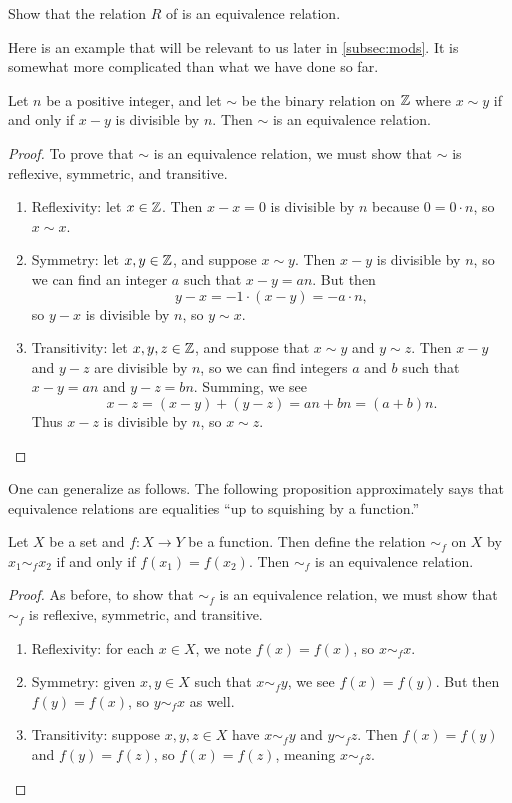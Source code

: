 \documentclass[../notes.tex]{subfiles}
\begin{document}
\begin{exe}
    Show that the relation $R$ of  is an equivalence relation.
\end{exe}
Here is an example that will be relevant to us later in \cref{subsec:mods}. It is somewhat more complicated than what we have done so far.
\begin{prop} \label{prop:mods-equiv-relation}
    Let $n$ be a positive integer, and let $\sim$ be the binary relation on $\mathbb Z$ where $x \sim y$ if and only if $x-y$ is divisible by $n$. Then $\sim$ is an equivalence relation.
\end{prop}
\begin{proof}
    To prove that $\sim$ is an equivalence relation, we must show that $\sim$ is reflexive, symmetric, and transitive.
    \begin{enumerate}[label=(\alph*)]
        \item Reflexivity: let $x \in \mathbb Z$. Then $x-x=0$ is divisible by $n$ because $0=0\cdot n$, so $x\sim x$.
        \item Symmetry: let $x, y \in \mathbb Z$, and suppose $x \sim y$. Then $x-y$ is divisible by $n$, so we can find an integer $a$ such that $x-y=an$. But then
        \[y-x=-1\cdot(x-y)=-a\cdot n,\]
        so $y-x$ is divisible by $n$, so $y\sim x$.
        \item Transitivity: let $x, y, z \in \mathbb Z$, and suppose that $x \sim y$ and $y \sim z$. Then $x-y$ and $y-z$ are divisible by $n$, so we can find integers $a$ and $b$ such that $x-y=an$ and $y-z=bn$. Summing, we see
        \[x-z=(x-y)+(y-z)=an+bn=(a+b)n.\]
        Thus $x-z$ is divisible by $n$, so $x\sim z$.
        \qedhere
    \end{enumerate}
\end{proof}
One can generalize  as follows. The following proposition approximately says that equivalence relations are equalities ``up to squishing by a function.''
\begin{proposition} \label{prop:function-to-equiv}
    Let $X$ be a set and $f\colon X\to Y$ be a function. Then define the relation $\sim_f$ on $X$ by $x_1\sim_f x_2$ if and only if $f(x_1)=f(x_2)$. Then $\sim_f$ is an equivalence relation.
\end{proposition}
\begin{proof}
    As before, to show that $\sim_f$ is an equivalence relation, we must show that $\sim_f$ is reflexive, symmetric, and transitive.
    \begin{enumerate}[label=(\alph*)]
        \item Reflexivity: for each $x\in X$, we note $f(x)=f(x)$, so $x\sim_fx$.
        \item Symmetry: given $x,y\in X$ such that $x\sim_fy$, we see $f(x)=f(y)$. But then $f(y)=f(x)$, so $y\sim_fx$ as well.
        \item Transitivity: suppose $x,y,z\in X$ have $x\sim_fy$ and $y\sim_fz$. Then $f(x)=f(y)$ and $f(y)=f(z)$, so $f(x)=f(z)$, meaning $x\sim_fz$.
        \qedhere
    \end{enumerate}
\end{proof}
\end{document}
